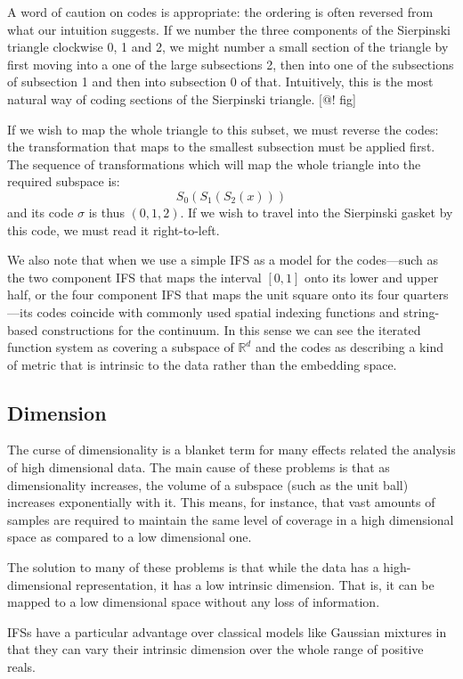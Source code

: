 \documentclass[11pt]{article}
\theoremstyle{definition}
\begin{document}
A word of caution on codes is appropriate: the ordering is often reversed from what our intuition suggests. If we number the three components of the Sierpinski triangle clockwise 0, 1 and 2, we might number a small section of the triangle by first moving into a one of the large subsections 2, then into one of the subsections of subsection 1 and then into subsection 0 of that. Intuitively, this is the most natural way of coding sections of the Sierpinski triangle. [@! fig]

If we wish to map the whole triangle to this subset, we must reverse the codes: the transformation that maps to the smallest subsection must be applied first. The sequence of transformations which will map the whole triangle into the required subspace is:
\[
S_0(S_1(S_2(x)))
\]
and its code $\sigma$ is thus $(0, 1, 2)$. If we wish to travel into the Sierpinski gasket by this code, we must read it right-to-left.

We also note that when we use a simple IFS as a model for the codes---such as the two component IFS that maps the interval $[0,1]$ onto its lower and upper half, or the four component IFS that maps the unit square onto its four quarters---its codes coincide with commonly used spatial indexing functions and string-based constructions for the continuum. In this sense we can see the iterated function system as covering a subspace of ${\mathbb R}^d$ and the codes as describing a kind of metric that is intrinsic to the data rather than the embedding space.

\subsection{Dimension}

The curse of dimensionality is a blanket term for many effects related the analysis of high dimensional data. The main cause of these problems is that as dimensionality increases, the volume of a subspace (such as the unit ball) increases exponentially with it. This means, for instance, that vast amounts of samples are required to maintain the same level of coverage in a high dimensional space as compared to a low dimensional one. 

The solution to many of these problems is that while the data has a high-dimensional representation, it has a low intrinsic dimension. That is, it can be mapped to a low dimensional space without any loss of information.

IFSs have a particular advantage over classical models like Gaussian mixtures in that they can vary their intrinsic dimension over the whole range of positive reals.
\end{document}
